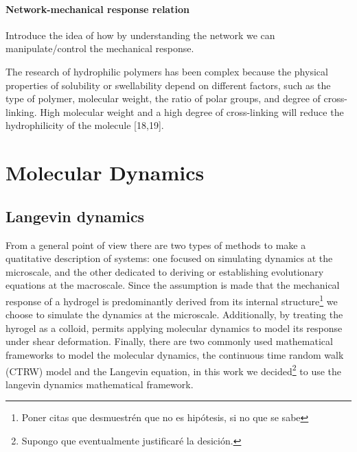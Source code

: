\paragraph{Network-mechanical response relation} Introduce the idea of how by understanding the network we can manipulate/control the mechanical response.

The research of hydrophilic polymers has been complex because the physical properties of solubility or swellability depend on different factors, such as the type of polymer, molecular weight, the ratio of polar groups, and degree of cross-linking\citep{bustamantetorresHydrogelsClassificationAccording2021}.
High molecular weight and a high degree of cross-linking will reduce the hydrophilicity of the molecule [18,19]\citep{bustamantetorresHydrogelsClassificationAccording2021}.


\section{Molecular Dynamics}

\subsection{Langevin dynamics}

From a general point of view there are two types of methods to make a quatitative description of systems: one focused on simulating dynamics at the microscale, and the other dedicated to deriving or establishing evolutionary equations at the macroscale\citep{wangMultiscaleModelingSimulation2025}.
Since the assumption is made that the mechanical response of a hydrogel is predominantly derived from its internal structure\footnote{Poner citas que desmuestrén que no es hipótesis, si no que se sabe} we choose to simulate the dynamics at the microscale.
Additionally, by treating the hyrogel as a colloid, permits applying molecular dynamics to model its response under shear deformation. 
Finally, there are two commonly used mathematical frameworks to model the molecular dynamics, the continuous time random walk (CTRW) model and the Langevin equation\citep{wangMultiscaleModelingSimulation2025}, in this work we decided\footnote{Supongo que eventualmente justificaré la desición.} to use the langevin dynamics mathematical framework.

